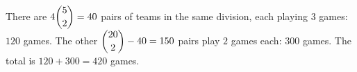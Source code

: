There are $4\dbinom52=40$ pairs of teams in the same division, each playing $3$ games: $120$ games. The other $\dbinom{20}2-40=150$ pairs play $2$ games each: $300$ games. The total is $120+300=\boxed{420}$ games.
